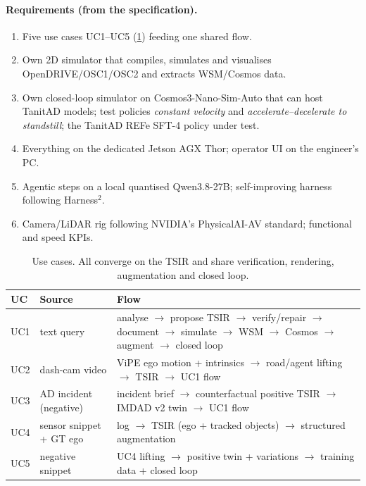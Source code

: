 \documentclass[10pt,a4paper]{article}
\begin{document}
\paragraph{Requirements (from the specification).}
\begin{enumerate}[nosep,leftmargin=1.4em]
\item Five use cases UC1--UC5 (\cref{tab:ucs}) feeding one shared flow.
\item Own 2D simulator that compiles, simulates and visualises OpenDRIVE/OSC1/OSC2 and extracts WSM/Cosmos data.
\item Own closed-loop simulator on Cosmos3-Nano-Sim-Auto that can host TanitAD models; test policies
      \emph{constant velocity} and \emph{accelerate--decelerate to standstill}; the TanitAD REFe SFT-4 policy under test.
\item Everything on the dedicated Jetson AGX Thor; operator UI on the engineer's PC.
\item Agentic steps on a local quantised Qwen3.8-27B; self-improving harness following Harness$^2$.
\item Camera/LiDAR rig following NVIDIA's PhysicalAI-AV standard; functional and speed KPIs.
\end{enumerate}

\begin{table}[h]\centering\small
\caption{Use cases. All converge on the TSIR and share verification, rendering, augmentation and closed loop.}\label{tab:ucs}
\begin{tabularx}{\linewidth}{@{}l l X@{}}\toprule
UC & Source & Flow \\\midrule
\textcolor{uca}{UC1} & text query & analyse $\to$ propose TSIR $\to$ verify/repair $\to$ document $\to$ simulate $\to$ WSM $\to$ Cosmos $\to$ augment $\to$ closed loop \\
\textcolor{ucb}{UC2} & dash-cam video & ViPE ego motion + intrinsics $\to$ road/agent lifting $\to$ TSIR $\to$ UC1 flow \\
\textcolor{ucc}{UC3} & AD incident (negative) & incident brief $\to$ counterfactual positive TSIR $\to$ IMDAD v2 twin $\to$ UC1 flow \\
\textcolor{ucd}{UC4} & sensor snippet + GT ego & log $\to$ TSIR (ego + tracked objects) $\to$ structured augmentation \\
\textcolor{uce}{UC5} & negative snippet & UC4 lifting $\to$ positive twin + variations $\to$ training data + closed loop \\\bottomrule
\end{tabularx}
\end{table}
\end{document}
